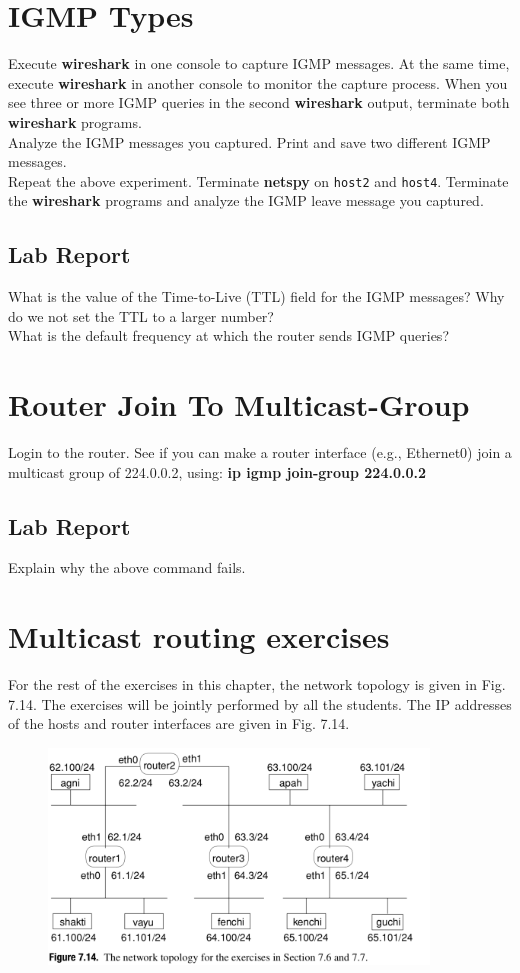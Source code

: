 \documentclass[10pt,a4paper]{article}
\numberwithin{equation}{section}
\numberwithin{figure}{section}
\numberwithin{table}{section}
\begin{document}
    \section{IGMP Types}
    Execute \textbf{wireshark} in one console to capture IGMP messages.
    At the same time, execute \textbf{wireshark} in another console to monitor the capture process.
    When you see three or more IGMP queries in the second \textbf{wireshark} output, terminate both \textbf{wireshark} programs. \\
    Analyze the IGMP messages you captured.
    Print and save two different IGMP messages. \\
    Repeat the above experiment.
    Terminate \textbf{netspy} on \texttt{host2} and \texttt{host4}.
    Terminate the \textbf{wireshark} programs and analyze the IGMP leave message you captured.
    \subsection*{Lab Report}
    What is the value of the Time-to-Live (TTL) field for the IGMP messages?
    Why do we not set the TTL to a larger number? \\
    What is the default frequency at which the router sends IGMP queries?

    \section{Router Join To Multicast-Group}
    Login to the router.
    See if you can make a router interface (e.g., Ethernet0) join a multicast group of 224.0.0.2, using:
    \textbf{ip igmp join-group 224.0.0.2}
    \subsection*{Lab Report}
    Explain why the above command fails.

    \section*{Multicast routing exercises}
    For the rest of the exercises in this chapter, the network topology is given in Fig. 7.14. The exercises will be jointly performed by all the students. The IP addresses of the hosts and router interfaces are given in Fig. 7.14.
    \begin{figure}[H]
        \centering
        \includegraphics[width=0.9\textwidth]{img/figure7-14.png}
        \label{fig:7.14}
    \end{figure}
\end{document}

